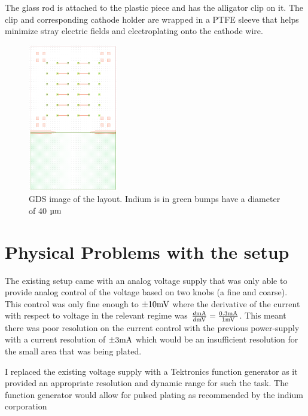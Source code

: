 The glass rod is attached to the plastic piece and has the alligator clip on it. The clip and corresponding cathode holder are wrapped in a PTFE sleeve that helps minimize stray electric fields and electroplating onto the cathode wire.


\begin{figure}
    \centering
    \includegraphics[width=0.35\textwidth]{Main/Ch1/GDS_V1.png}
    \caption{GDS image of the layout. Indium is in green bumps have a diameter of 40 $\um$}
    \label{fig:gds_ch1}
    \vspace{.2cm}
\end{figure}


\section{Physical Problems with the setup}

The existing setup came with an analog voltage supply that was only able to provide analog control of the voltage based on two knobs (a fine and coarse). This control was only fine enough to $\pm 10 \mV$ where the derivative of the current with respect to voltage in the relevant regime was $\frac{d \mA}{d \mV} = \frac{0.3 \mA}{1 \mV}$.
This meant there was poor resolution on the current control with the previous power-supply with a current resolution of $\pm 3 \mA$ which would be an insufficient resolution for the small area that was being plated.

I replaced the existing voltage supply with a Tektronics function generator as it provided an appropriate resolution and dynamic range for such the task.
The function generator would allow for pulsed plating as recommended by the indium corporation \cite{indiumCorpGrainStructure}


